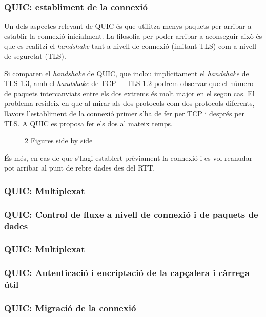 \subsubsection{QUIC: establiment de la connexió}
{
    Un dels aspectes relevant de QUIC és que utilitza menys paquets per arribar a establir la connexió inicialment. La filosofia per poder
    arribar a aconseguir això és que es realitzi el \textit{handshake} tant a nivell de connexió (imitant TLS) com a nivell de seguretat (TLS).

    Si comparen el \textit{handshake} de QUIC, que inclou implícitament el \textit{handshake} de TLS 1.3, amb el \textit{handshake} de TCP + TLS 1.2
    podrem observar que el número de paquets intercanviats entre els dos extrems és molt major en el segon cas. El problema resideix en que al mirar 
    als dos protocols com dos protocols diferents, llavors l'establiment de la connexió primer s'ha de fer per TCP i després per TLS. A QUIC es 
    proposa fer els dos al mateix temps.

    \begin{figure}%
        \centering
        \qquad
        \caption{2 Figures side by side}%
        \label{fig:example}%
    \end{figure}





    És més, en cas de que
    s'hagi establert prèviament la connexió i es vol reanudar pot arribar al punt de rebre dades des del \ac{RTT}.  
}

\subsubsection{QUIC: Multiplexat}
{

}

\subsubsection{QUIC: Control de fluxe a nivell de connexió i de paquets de dades}
{
    
}

\subsubsection{QUIC: Multiplexat}
{
    
}

\subsubsection{QUIC: Autenticació i encriptació de la capçalera i càrrega útil}
{
    
}

\subsubsection{QUIC: Migració de la connexió}
{
    
}
